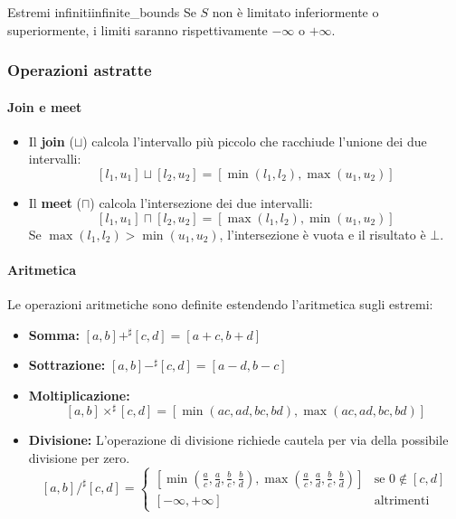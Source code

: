 \begin{nota}{Estremi infiniti}{infinite_bounds}
Se $S$ non è limitato inferiormente o superiormente, i limiti saranno
rispettivamente $-\infty$ o $+\infty$.
\end{nota}

\subsubsection{Operazioni astratte}

\paragraph{Join e meet}
\begin{itemize}
    \item Il \textbf{join} ($\sqcup$) calcola l'intervallo più piccolo che
    racchiude l'unione dei due intervalli:
    \[
    [l_1, u_1] \sqcup [l_2, u_2] = [\min(l_1, l_2), \max(u_1, u_2)]
    \]
    \item Il \textbf{meet} ($\sqcap$) calcola l'intersezione dei due
    intervalli:
    \[
    [l_1, u_1] \sqcap [l_2, u_2] = [\max(l_1, l_2), \min(u_1, u_2)]
    \]
    Se $\max(l_1, l_2) > \min(u_1, u_2)$, l'intersezione è vuota e
    il risultato è $\bot$.
\end{itemize}

\paragraph{Aritmetica}
Le operazioni aritmetiche sono definite estendendo l'aritmetica sugli estremi:
\begin{itemize}
    \item \textbf{Somma:} $[a, b] +^\sharp [c, d] = [a+c, b+d]$
    \item \textbf{Sottrazione:} $[a, b] -^\sharp [c, d] = [a-d, b-c]$
    \item \textbf{Moltiplicazione:}
    \[
    [a, b] \times^\sharp [c, d] = [\min(ac, ad, bc, bd), \max(ac, ad, bc, bd)]
    \]
    \item \textbf{Divisione:} L'operazione di divisione richiede cautela per
    via della possibile divisione per zero.
    \[
    [a, b] /^\sharp [c, d] =
    \begin{cases}
        \left[
            \min\left(
                \frac{a}{c}, \frac{a}{d}, \frac{b}{c}, \frac{b}{d}
                \right),
            \max\left(
                \frac{a}{c}, \frac{a}{d}, \frac{b}{c}, \frac{b}{d}
                \right)
        \right] & \text{se } 0 \notin [c, d] \\
        [-\infty, +\infty] & \text{altrimenti}
    \end{cases}
    \]
\end{itemize}

